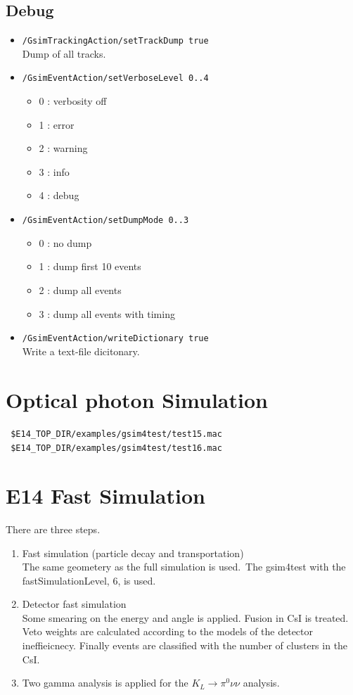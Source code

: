 \documentclass[a4paper,12pt]{article}
\begin{document}
  \subsection{Debug}
  \begin{itemize}
   \item {\tt /GsimTrackingAction/setTrackDump true}\\
	 Dump of all tracks.
   \item {\tt /GsimEventAction/setVerboseLevel 0..4}
	 \begin{itemize}
	  \item 0 : verbosity off\\
	  \item 1 : error\\
	  \item 2 : warning\\
	  \item 3 : info\\
	  \item 4 : debug\\
	 \end{itemize}
   \item {\tt /GsimEventAction/setDumpMode 0..3}
	 \begin{itemize}
	  \item 0 : no dump
	  \item 1 : dump first 10 events
	  \item 2 : dump all events
	  \item 3 : dump all events with timing
	 \end{itemize}
   \item {\tt /GsimEventAction/writeDictionary true}\\
	 Write a text-file dicitonary.
  \end{itemize}
 \section{Optical photon Simulation}
 {\tt
 \$E14\_TOP\_DIR/examples/gsim4test/test15.mac}\\
 
 {\tt
 \$E14\_TOP\_DIR/examples/gsim4test/test16.mac}
 
 \section{E14 Fast Simulation}
 There are three steps.
 \begin{enumerate}
  \item Fast simulation (particle decay and transportation)\\
	The same geometery as the full
	simulation is used.\
	The gsim4test with the fastSimulationLevel, 6, is used.
  \item Detector fast simulation\\
	Some smearing on the energy and angle is applied.
	Fusion in CsI is treated. Veto weights are calculated according
	to the models of the  detector ineffieicnecy. Finally events are
	classified with the number of clusters in the CsI.
  \item Two gamma analysis is applied for the $K_L\to\pi^0\nu\nu$
	analysis.
 \end{enumerate}
\end{document}
